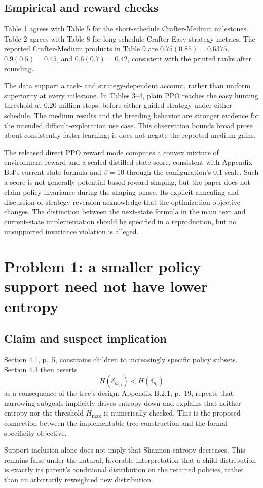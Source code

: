 \documentclass[10pt]{article}
\begin{document}
\subsection*{Empirical and reward checks}
Table 1 agrees with Table 5 for the short-schedule Crafter-Medium milestones. Table 2 agrees with Table 8 for long-schedule Crafter-Easy strategy metrics. The reported Crafter-Medium products in Table 9 are \(0.75(0.85)=0.6375\), \(0.9(0.5)=0.45\), and \(0.6(0.7)=0.42\), consistent with the printed ranks after rounding.\par
The data support a task- and strategy-dependent account, rather than uniform superiority at every milestone. In Tables 3–4, plain PPO reaches the easy hunting threshold at \(0.20\) million steps, before either guided strategy under either schedule. The medium results and the breeding behavior are stronger evidence for the intended difficult-exploration use case. This observation bounds broad prose about consistently faster learning; it does not negate the reported medium gains.\par
The released direct PPO reward mode computes a convex mixture of environment reward and a scaled distilled state score, consistent with Appendix B.4’s current-state formula and \(\beta=10\) through the configuration’s \(0.1\) scale. Such a score is not generally potential-based reward shaping, but the paper does not claim policy invariance during the shaping phase. Its explicit annealing and discussion of strategy reversion acknowledge that the optimization objective changes. The distinction between the next-state formula in the main text and current-state implementation should be specified in a reproduction, but no unsupported invariance violation is alleged.\par
\section*{Problem 1: a smaller policy support need not have lower entropy}
\subsection*{Claim and suspect implication}
Section 4.1, p. 5, constrains children to increasingly specific policy subsets. Section 4.3 then asserts \[H(\delta_{h_{i,j}})<H(\delta_{h_i})\] as a consequence of the tree’s design. Appendix B.2.1, p. 19, repeats that narrowing subgoals implicitly drives entropy down and explains that neither entropy nor the threshold \(H_{\max}\) is numerically checked. This is the proposed connection between the implementable tree construction and the formal specificity objective.\par
Support inclusion alone does not imply that Shannon entropy decreases. This remains false under the natural, favorable interpretation that a child distribution is exactly its parent’s conditional distribution on the retained policies, rather than an arbitrarily reweighted new distribution.\par
\end{document}

